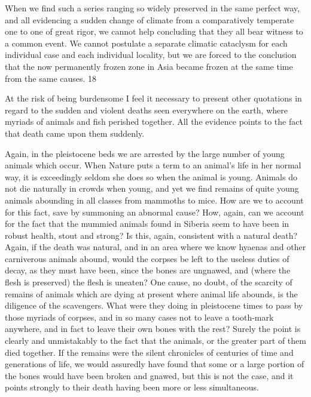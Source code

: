 When we find such a series ranging so widely preserved in the same perfect way, and all
evidencing a sudden change of climate from a comparatively temperate one to one of great
rigor, we cannot help concluding that they all bear witness to a common event. We cannot
postulate a separate climatic cataclysm for each individual case and each individual locality,
but we are forced to the conclusion that the now permanently frozen zone in Asia became
frozen at the same time from the same causes. 18

At the risk of being burdensome I feel it necessary to present other quotations in regard to the
sudden and violent deaths seen everywhere on the earth, where myriads of animals and fish
perished together. All the evidence points to the fact that death came upon them suddenly.

Again, in the pleistocene beds we are arrested by the large number of young animals which
occur. When Nature puts a term to an animal's life in her normal way, it is exceedingly
seldom she does so when the animal is young. Animals do not die naturally in crowds when
young, and yet we find remains of quite young animals abounding in all classes from
mammoths to mice. How are we to account for this fact, save by summoning an abnormal
cause? How, again, can we account for the fact that the mummied animals found in Siberia
seem to have been in robust health, stout and strong? Is this, again, consistent with a natural
death? Again, if the death was natural, and in an area where we know hyaenas and other
carniverous animals abound, would the corpses be left to the useless duties of decay, as they
must have been, since the bones are ungnawed, and (where the flesh is preserved) the flesh is
uneaten? One cause, no doubt, of the scarcity of remains of animals which are dying at
present where animal life abounds, is the diligence of the scavengers. What were they doing
in pleistocene times to pass by those myriads of corpses, and in so many cases not to leave a
tooth-mark anywhere, and in fact to leave their own bones with the rest? Surely the point is
clearly and unmistakably to the fact that the animals, or the greater part of them died
together. If the remains were the silent chronicles of centuries of time and generations of life,
we would assuredly have found that some or a large portion of the bones would have been
broken and gnawed, but this is not the case, and it points strongly to their death having been
more or less simultaneous.

